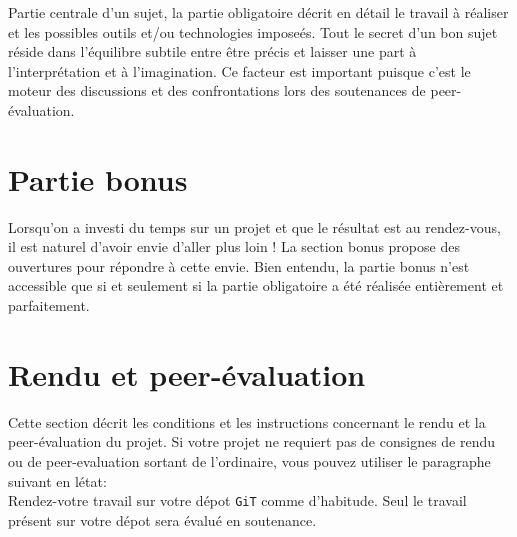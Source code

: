 \documentclass{42-fr}
\begin{document}
    Partie centrale d'un sujet, la partie obligatoire d\'ecrit en
    d\'etail le travail \`a r\'ealiser et les possibles outils et/ou
    technologies impose\'es. Tout le secret d'un bon sujet
    r\'eside dans l'\'equilibre subtile entre \^etre pr\'ecis et
    laisser une part \`a l'interpr\'etation et \`a l'imagination. Ce
    facteur est important puisque c'est le moteur des discussions et
    des confrontations lors des soutenances de peer-\'evaluation.



\chapter{Partie bonus}

    Lorsqu'on a investi du temps sur un projet et que le r\'esultat
    est au rendez-vous, il est naturel d'avoir envie d'aller plus loin !
    La section bonus propose des ouvertures pour r\'epondre \`a
    cette envie. Bien entendu, la partie bonus n'est accessible que si
    et seulement si la partie obligatoire a \'et\'e r\'ealis\'ee
    enti\`erement et parfaitement.


\chapter{Rendu et peer-\'evaluation}

    Cette section d\'ecrit les conditions et les instructions
    concernant le rendu et la peer-\'evaluation du projet. Si votre
    projet ne requiert pas de consignes de rendu ou de peer-evaluation
    sortant de l'ordinaire, vous pouvez utiliser le paragraphe suivant
    en l\'etat:\\

    Rendez-votre travail sur votre d\'epot \texttt{GiT} comme
    d'habitude. Seul le travail pr\'esent sur votre d\'epot sera
    \'evalu\'e en soutenance.



\end{document}
